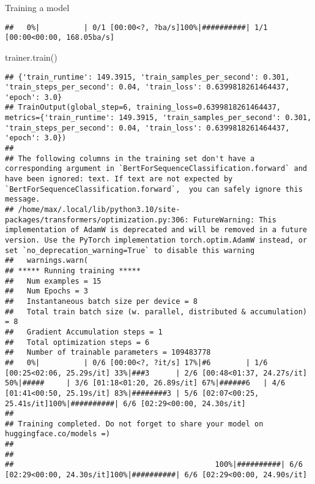 \documentclass[
  10pt,
  ignorenonframetext,
  aspectratio=169]{beamer}
\newenvironment{Shaded}{\begin{snugshade}}{\end{snugshade}}
\newcommand{\NormalTok}[1]{\textcolor[rgb]{0.80,0.80,0.80}{#1}}
\begin{document}
\begin{frame}[fragile]{Training a model}
\begin{verbatim}
##   0%|          | 0/1 [00:00<?, ?ba/s]100%|##########| 1/1 [00:00<00:00, 168.05ba/s]
\end{verbatim}

\begin{Shaded}
\begin{Highlighting}[]
\NormalTok{trainer.train()}
\end{Highlighting}
\end{Shaded}

\begin{verbatim}
## {'train_runtime': 149.3915, 'train_samples_per_second': 0.301, 'train_steps_per_second': 0.04, 'train_loss': 0.6399818261464437, 'epoch': 3.0}
## TrainOutput(global_step=6, training_loss=0.6399818261464437, metrics={'train_runtime': 149.3915, 'train_samples_per_second': 0.301, 'train_steps_per_second': 0.04, 'train_loss': 0.6399818261464437, 'epoch': 3.0})
## 
## The following columns in the training set don't have a corresponding argument in `BertForSequenceClassification.forward` and have been ignored: text. If text are not expected by `BertForSequenceClassification.forward`,  you can safely ignore this message.
## /home/max/.local/lib/python3.10/site-packages/transformers/optimization.py:306: FutureWarning: This implementation of AdamW is deprecated and will be removed in a future version. Use the PyTorch implementation torch.optim.AdamW instead, or set `no_deprecation_warning=True` to disable this warning
##   warnings.warn(
## ***** Running training *****
##   Num examples = 15
##   Num Epochs = 3
##   Instantaneous batch size per device = 8
##   Total train batch size (w. parallel, distributed & accumulation) = 8
##   Gradient Accumulation steps = 1
##   Total optimization steps = 6
##   Number of trainable parameters = 109483778
##   0%|          | 0/6 [00:00<?, ?it/s] 17%|#6        | 1/6 [00:25<02:06, 25.29s/it] 33%|###3      | 2/6 [00:48<01:37, 24.27s/it] 50%|#####     | 3/6 [01:18<01:20, 26.89s/it] 67%|######6   | 4/6 [01:41<00:50, 25.19s/it] 83%|########3 | 5/6 [02:07<00:25, 25.41s/it]100%|##########| 6/6 [02:29<00:00, 24.30s/it]
## 
## Training completed. Do not forget to share your model on huggingface.co/models =)
## 
## 
##                                              100%|##########| 6/6 [02:29<00:00, 24.30s/it]100%|##########| 6/6 [02:29<00:00, 24.90s/it]
\end{verbatim}
\end{frame}
\end{document}
